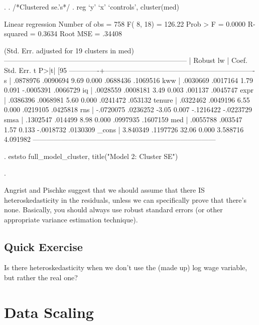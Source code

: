 \documentclass[12pt]{article}
\begin{document}
\begin{stlog}
. 
. /*Clustered se.'s*/
. reg `y' `x' `controls', cluster(med)

Linear regression                                      Number of obs =     758
                                                       F(  8,    18) =  126.22
                                                       Prob > F      =  0.0000
                                                       R-squared     =  0.3634
                                                       Root MSE      =  .34408

                                   (Std. Err. adjusted for 19 clusters in med)
------------------------------------------------------------------------------
             |               Robust
          lw |      Coef.   Std. Err.      t    P>|t|     [95%
-------------+----------------------------------------------------------------
           s |   .0878976   .0090694     9.69   0.000     .0688436    .1069516
         kww |   .0030669   .0017164     1.79   0.091    -.0005391    .0066729
          iq |   .0028559   .0008181     3.49   0.003      .001137    .0045747
        expr |   .0386396   .0068981     5.60   0.000     .0241472     .053132
      tenure |   .0322462   .0049196     6.55   0.000     .0219105    .0425818
         rns |  -.0720075   .0236252    -3.05   0.007    -.1216422   -.0223729
        smsa |   .1302547    .014499     8.98   0.000     .0997935    .1607159
         med |   .0055788    .003547     1.57   0.133    -.0018732    .0130309
       _cons |   3.840349   .1197726    32.06   0.000     3.588716    4.091982
------------------------------------------------------------------------------

. eststo full_model_cluster, title("Model 2: Cluster SE")

. 
\end{stlog}

Angrist and Pischke suggest that we should assume that there IS
heteroskedasticity in the residuals, unless we can specifically prove
that there's none. Basically, you should always use robust standard
errors (or other appropriate variance estimation technique). 

\subsection{Quick Exercise}

Is there heteroskedasticity when we don't use the (made up) log wage
variable, but rather the real one?

\section{Data Scaling}
\label{sec:data-scaling}
\end{document}
